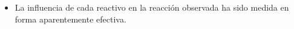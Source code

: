 \documentclass[../main]{subfiles}
\begin{document}
\begin{itemize}
  \item La influencia de cada reactivo en la reacción observada ha sido medida en forma aparentemente efectiva.
\end{itemize}
\end{document}
